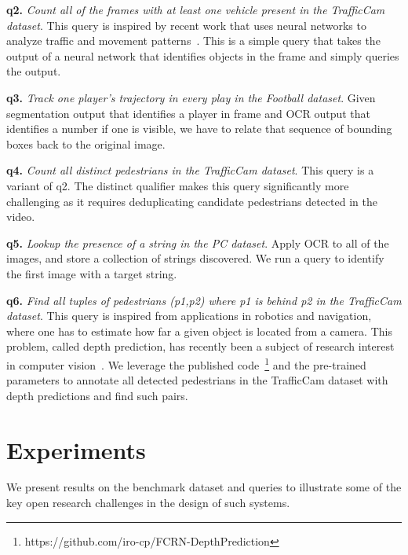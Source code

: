 \vspace{0.25em} \noindent \textbf{q2.} \emph{Count all of the frames with at least one vehicle present in the TrafficCam dataset}. This query is inspired by recent work that uses neural networks to analyze traffic and movement patterns~\cite{kang2017noscope}. This is a simple query that takes the output of a neural network that identifies objects in the frame and simply queries the output.

\vspace{0.25em} \noindent \textbf{q3.} \emph{Track one player's trajectory in every play in the Football dataset}. Given segmentation output that identifies a player in frame and OCR output that identifies a number if one is visible, we have to relate that sequence of bounding boxes back to the original image.

\vspace{0.25em} \noindent \textbf{q4.} \emph{Count all distinct pedestrians in the TrafficCam dataset}. This query is a variant of q2. The distinct qualifier makes this query significantly more challenging as it requires deduplicating candidate pedestrians detected in the video.

\vspace{0.25em} \noindent \textbf{q5.} \emph{Lookup the presence of a string in the PC dataset}. Apply OCR to all of the images, and store a collection of strings discovered. We run a query to identify the first image with a target string.

\vspace{0.25em} \noindent \textbf{q6.} \emph{Find all tuples of pedestrians (p1,p2) where p1 is behind p2 in the TrafficCam dataset}. This query is inspired from applications in robotics and navigation, where one has to estimate how far a given object is located from a camera. This problem, called depth prediction, has recently been a subject of research interest in computer vision~\cite{depthPredictModel}. We leverage the published code~\footnote{https://github.com/iro-cp/FCRN-DepthPrediction} and the pre-trained parameters to annotate all detected pedestrians in the TrafficCam dataset with depth predictions and find such pairs.

\section{Experiments}
We present results on the benchmark dataset and queries to illustrate some of the key open research challenges in the design of such systems.


